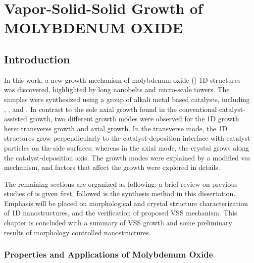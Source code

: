 \chapter{Vapor-Solid-Solid Growth of MOLYBDENUM OXIDE}

\section{Introduction}

In this work, a new growth mechanism of molybdenum oxide () 1D structures was discovered, highlighted by  long nanobelts and micro-scale towers. The samples were synthesized using a group of alkali metal based catalysts, including , , and . In contrast to the sole axial growth found in the conventional catalyst-assisted growth, two different growth modes were observed for the  1D growth here: transverse growth and axial growth. In the transverse mode, the 1D structures grow perpendicularly to the catalyst-deposition interface with catalyst particles on the side surfaces; whereas in the axial mode, the crystal grows along the catalyst-deposition axis. The growth modes were explained by a modified \gls{vss} mechanism, and factors that affect the growth were explored in details. 

The remaining sections are organized as following: a brief review on previous studies of  is given first, followed is the synthesis method in this dissertation. Emphasis will be placed on morphological and crystal structure characterization of 1D  nanostructures, and the verification of proposed VSS mechanism. This chapter is concluded with a summary of VSS growth and some preliminary results of morphology controlled  nanostructures. 

\subsection{Properties and Applications of Molybdenum Oxide}


